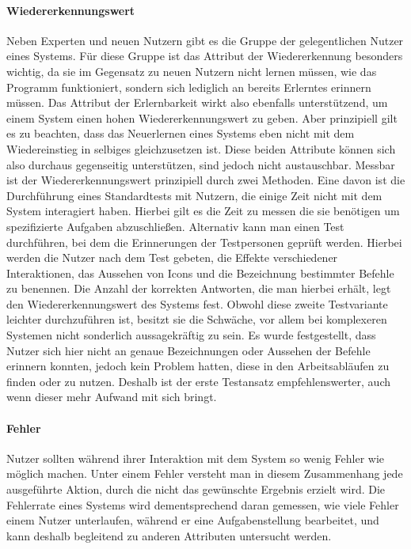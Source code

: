 \paragraph{Wiedererkennungswert}
Neben Experten und neuen Nutzern gibt es die Gruppe der gelegentlichen Nutzer eines Systems.
Für diese Gruppe ist das Attribut der Wiedererkennung besonders wichtig, da sie im Gegensatz zu neuen Nutzern nicht lernen müssen, wie das Programm funktioniert, sondern sich lediglich an bereits Erlerntes erinnern müssen.
Das Attribut der Erlernbarkeit wirkt also ebenfalls unterstützend, um einem System einen hohen Wiedererkennungswert zu geben.
Aber prinzipiell gilt es zu beachten, dass das Neuerlernen eines Systems eben nicht mit dem Wiedereinstieg in selbiges gleichzusetzen ist.
Diese beiden Attribute können sich also durchaus gegenseitig unterstützen, sind jedoch nicht austauschbar.
Messbar ist der Wiedererkennungswert prinzipiell durch zwei Methoden.
Eine davon ist die Durchführung eines Standardtests mit Nutzern, die einige Zeit nicht mit dem System interagiert haben.
Hierbei gilt es die Zeit zu messen die sie benötigen um spezifizierte Aufgaben abzuschließen.
Alternativ kann man einen Test durchführen, bei dem die Erinnerungen der Testpersonen geprüft werden.
Hierbei werden die Nutzer nach dem Test gebeten, die Effekte verschiedener Interaktionen, das Aussehen von Icons und die Bezeichnung bestimmter Befehle zu benennen.
Die Anzahl der korrekten Antworten, die man hierbei erhält, legt den Wiedererkennungswert des Systems fest.
Obwohl diese zweite Testvariante leichter durchzuführen ist, besitzt sie die Schwäche, vor allem bei komplexeren Systemen nicht sonderlich aussagekräftig zu sein.
Es wurde festgestellt, dass Nutzer sich hier nicht an genaue Bezeichnungen oder Aussehen der Befehle erinnern konnten, jedoch kein Problem hatten, diese in den Arbeitsabläufen zu finden oder zu nutzen.
Deshalb ist der erste Testansatz empfehlenswerter, auch wenn dieser mehr Aufwand mit sich bringt.

\paragraph{Fehler}
Nutzer sollten während ihrer Interaktion mit dem System so wenig Fehler wie möglich machen. 
Unter einem Fehler versteht man in diesem Zusammenhang jede ausgeführte Aktion, durch die nicht das gewünschte Ergebnis erzielt wird.
Die Fehlerrate eines Systems wird dementsprechend daran gemessen, wie viele Fehler einem Nutzer unterlaufen, während er eine Aufgabenstellung bearbeitet, und kann deshalb begleitend zu anderen Attributen untersucht werden.

